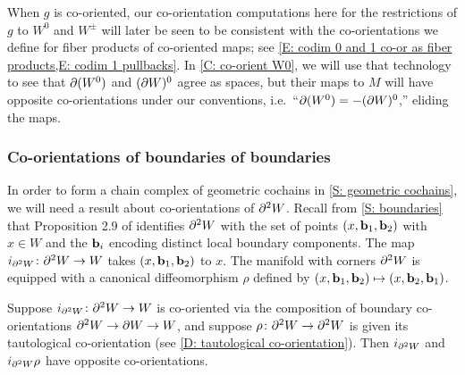 \begin{example}
	When $g$ is co-oriented, our co-orientation computations here for the restrictions of $g$ to $W^0$ and $W^\pm$ will later be seen to be consistent with the co-orientations we define for fiber products of co-oriented maps; see \cref{E: codim 0 and 1 co-or as fiber products,E: codim 1 pullbacks}.
	In \cref{C: co-orient W0}, we will use that technology to see that $\partial (W^0)$ and $(\partial W)^0$ agree as spaces, but their maps to $M$ will have opposite co-orientations under our conventions, i.e.\ ``$\partial (W^0) = -(\partial W)^0$,'' eliding the maps.
\end{example}

\begin{comment}
	\red{TO DO SOMEWHERE: It will be convenient to show that $g \colon W^0 \to M$ with this co-orientation is the pullback of $M^0 \into M$ (co-oriented as defined here) and $g \colon W \to M$ and similarly for $g \colon W^\pm \to M$.
		Also need to rewrite things in other places as $M^0$, $M^\pm$, etc instead of always writing $\varphi^{-1}((\infty,0])$ etc.
		Also need to show that $\bd W^0 = -(\bd W)^0$, which should follow from the Leibniz rule and the first thing the previous sentence.}
\end{comment}

\subsubsection{Co-orientations of boundaries of boundaries}

In order to form a chain complex of geometric cochains in \cref{S: geometric cochains}, we will need a result about co-orientations of $\partial^2 W$.
Recall from \cref{S: boundaries} that Proposition 2.9 of \cite{Joy12} identifies $\partial^2 W$ with the set of points $(x,\mathbf{b}_1,\mathbf{b}_2)$ with $x \in W$ and the $\mathbf{b}_i$ encoding distinct local boundary components.
The map $i_{\partial^2 W} \colon \partial^2 W \to W$ takes $(x,\mathbf{b}_1,\mathbf{b}_2)$ to $x$.
The manifold with corners $\partial^2 W$ is equipped with a canonical diffeomorphism $\rho$ defined by $(x,\mathbf{b}_1,\mathbf{b}_2) \mapsto (x,\mathbf{b}_2,\mathbf{b}_1)$.

\begin{lemma}\label{L: boundary2}
	Suppose $i_{\partial^2 W} \colon \partial^2 W \to W$ is co-oriented via the composition of boundary co-orientations $\partial^2 W \to \partial W \to W$, and suppose $\rho \colon \partial^2 W \to \partial^2 W$ is given its tautological co-orientation (see \cref{D: tautological co-orientation}).
	Then $i_{\partial^2 W}$ and $i_{\partial^2 W}\rho$ have opposite co-orientations.
\end{lemma}


